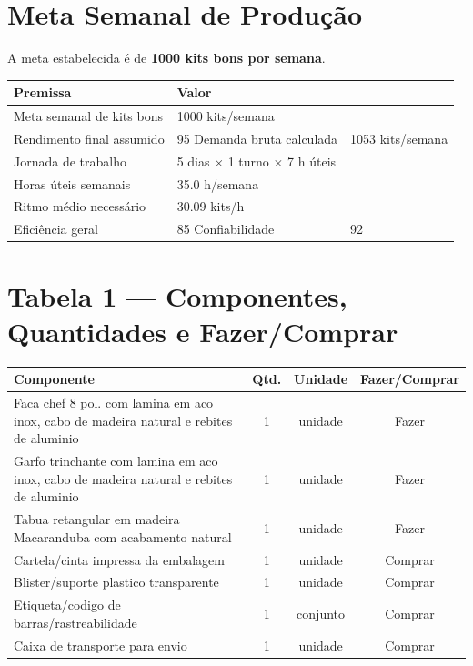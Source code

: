 \documentclass[12pt,a4paper,oneside,english,brazil]{abntex2}
\begin{document}
\chapter{Meta Semanal de Produção}
A meta estabelecida é de \textbf{1000 kits bons por semana}.

\begin{table}[H]
\begin{tabular}{ll}
\toprule
Premissa & Valor \\
\midrule
  Meta semanal de kits bons & 1000 kits/semana \\
  Rendimento final assumido & 95%
  Demanda bruta calculada & 1053 kits/semana \\
  Jornada de trabalho & 5 dias × 1 turno × 7 h úteis \\
  Horas úteis semanais & 35.0 h/semana \\
  Ritmo médio necessário & 30.09 kits/h \\
  Eficiência geral & 85%
  Confiabilidade & 92%
\bottomrule
\end{tabular}
{}
\end{table}

\chapter{Tabela 1 --- Componentes, Quantidades e Fazer/Comprar}
\begin{table}[H]
\begin{tabular}{p{8cm}ccc}
\toprule
Componente & Qtd. & Unidade & Fazer/Comprar \\
\midrule
  Faca chef 8 pol. com lamina em aco inox, cabo de madeira natural e rebites de aluminio & 1 & unidade & Fazer \\
  Garfo trinchante com lamina em aco inox, cabo de madeira natural e rebites de aluminio & 1 & unidade & Fazer \\
  Tabua retangular em madeira Macaranduba com acabamento natural & 1 & unidade & Fazer \\
  Cartela/cinta impressa da embalagem & 1 & unidade & Comprar \\
  Blister/suporte plastico transparente & 1 & unidade & Comprar \\
  Etiqueta/codigo de barras/rastreabilidade & 1 & conjunto & Comprar \\
  Caixa de transporte para envio & 1 & unidade & Comprar \\
\bottomrule
\end{tabular}
{}
\end{table}
\end{document}
